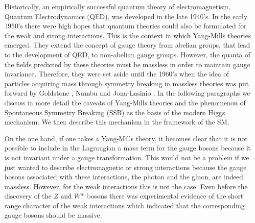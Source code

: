 
Historically, an empirically successful quantum theory of electromagnetism, Quantum Electrodynamics (QED), was developed in the late 1940's. In the early 1950's there were high hopes that quantum theories could also be formulated for the weak and strong interactions. This is the context in which Yang-Mills theories emerged. They extend the concept of gauge theory from abelian groups, that lead to the development of QED, to non-abelian gauge groups. However, the quanta of the fields predicted by these theories must be massless in order to maintain gauge invariance. Therefore, they were set aside until the 1960's when the idea of particles acquiring mass through symmetry breaking in massless theories was put forward by Goldstone \cite{Goldstone}, Nambu and Jona-Lasinio \cite{Nambu-Jona-Lasinio}. In the following paragraphs we discuss in more detail the caveats of Yang-Mills theories and the phenomenon of Spontaneous Symmetry Breaking (SSB) as the basis of the modern Higgs mechanism. We then describe this mechanism in the framework of the SM.   

On the one hand, if one takes a Yang-Mills theory, it becomes clear that it is not possible to include in the Lagrangian a mass term for the gauge bosons because it is not invariant under a gauge transformation. This would not be a problem if we just wanted to describe electromagnetic or strong interactions because the gauge bosons associated with these interactions, the photon and the gluon, are indeed massless. However, for the weak interactions this is not the case. Even before the discovery of the $Z$ and $W^{\pm}$ bosons \cite{Zdiscovery,Wdiscovery} there was experimental evidence of the short range character of the weak interactions which indicated that the corresponding gauge bosons should be massive. 

